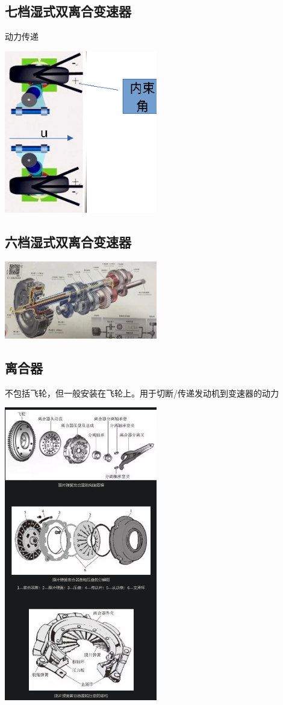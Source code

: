	\subsection{七档湿式双离合变速器}
		动力传递
		\begin{center}
			\includegraphics[width=0.5\textwidth]{3-21}
		\end{center}
	\subsection{六档湿式双离合变速器}
		\begin{center}
			\includegraphics[width=0.5\textwidth]{3-19}
		\end{center}
	\clearpage
	\subsection{离合器}
		不包括飞轮，但一般安装在飞轮上。用于切断/传递发动机到变速器的动力
		\begin{center}
			\includegraphics[width=0.5\textwidth]{3-7}
		\end{center}

